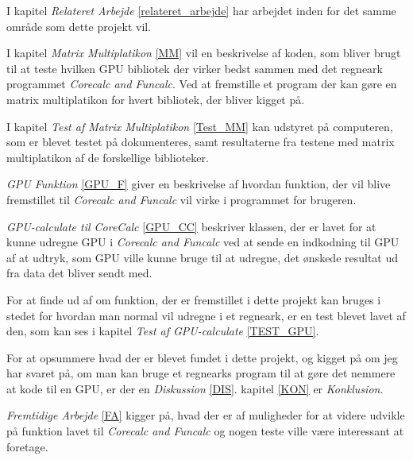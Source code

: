 I kapitel \textit{Relateret Arbejde} \ref{relateret_arbejde} har arbejdet inden for det samme område som dette projekt vil.

I kapitel \textit{Matrix Multiplatikon} \ref{MM} vil en beskrivelse af koden, som bliver brugt til at teste hvilken GPU bibliotek der virker bedst sammen med det regneark programmet \textit{Corecalc and Funcalc}. Ved at fremstille et program der kan gøre en matrix multiplatikon for hvert bibliotek, der bliver kigget på.

I kapitel \textit{Test af Matrix Multiplatikon} \ref{Test_MM} kan udstyret på computeren, som er blevet testet på dokumenteres, samt resultaterne fra testene med matrix multiplatikon af de forskellige biblioteker.

\textit{GPU Funktion} \ref{GPU_F} giver en beskrivelse af hvordan funktion, der vil blive fremstillet til \textit{Corecalc and Funcalc} vil virke i programmet for brugeren.

\textit{GPU-calculate til CoreCalc} \ref{GPU_CC} beskriver klassen, der er lavet for at kunne udregne GPU i \textit{Corecalc and Funcalc} ved at sende en indkodning til GPU af at udtryk, som GPU ville kunne bruge til at udregne, det ønskede resultat ud fra data det bliver sendt med.

For at finde ud af om funktion, der er fremstillet i dette projekt kan bruges i stedet for hvordan man normal vil udregne i et regneark, er en test blevet lavet af den, som kan ses i kapitel \textit{Test af GPU-calculate} \ref{TEST_GPU}.

For at opsummere hvad der er blevet fundet i dette projekt, og kigget på om jeg har svaret på, om man kan bruge et regnearks program til at gøre det nemmere at kode til en GPU, er der en \textit{Diskussion} \ref{DIS}. kapitel \ref{KON} er \textit{Konklusion}.

\textit{Fremtidige Arbejde} \ref{FA} kigger på, hvad der er af muligheder for at videre udvikle på funktion lavet til \textit{Corecalc and Funcalc} og nogen teste ville være interessant at foretage.